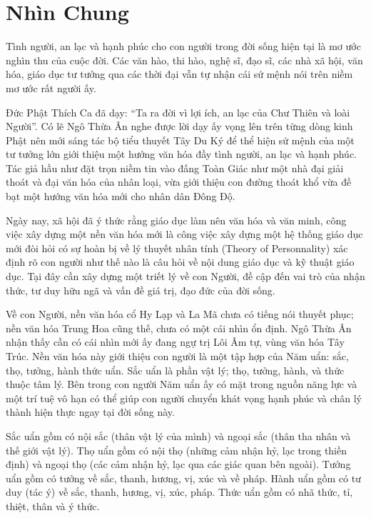 \chapter{Nhìn Chung} %
\label{cha:nhin_chung}

Tình người, an lạc và hạnh phúc cho con người trong đời sống hiện tại là mơ ước nghìn thu của cuộc đời. Các văn hào, thi hào, nghệ sĩ, đạo sĩ, các nhà xã hội, văn hóa, giáo dục tư tưởng qua các thời đại vẫn tự nhận cái sứ mệnh nói trên niềm mơ ước rất người ấy.

Đức Phật Thích Ca đã dạy: ``Ta ra đời vì lợi ích, an lạc của Chư Thiên và loài Người''. Có lẽ Ngô Thừa Ân nghe được lời dạy ấy vọng lên trên từng dòng kinh Phật nên mới sáng tác bộ tiểu thuyết Tây Du Ký để thể hiện sứ mệnh của một tư tưởng lớn giới thiệu một hướng văn hóa đầy tình người, an lạc và hạnh phúc. Tác giả hầu như đặt trọn niềm tin vào đấng Toàn Giác như một nhà đại giải thoát và đại văn hóa của nhân loại, vừa giới thiệu con đường thoát khổ vừa đề bạt một hướng văn hóa mới cho nhân dân Đông Độ.

Ngày nay, xã hội đã ý thức rằng giáo dục làm nên văn hóa và văn minh, công việc xây dựng một nền văn hóa mới là công việc xây dựng một hệ thống giáo dục mới đòi hỏi có sự hoàn bị về lý thuyết nhân tính (Theory of Personnality) xác định rõ con người như thế nào là câu hỏi về nội dung giáo dục và kỹ thuật giáo dục. Tại đây cần xây dựng một triết lý về con Người, đề cập đến vai trò của nhận thức, tư duy hữu ngã và vấn đề giá trị, đạo đức của đời sống.

Về con Người, nền văn hóa cổ Hy Lạp và La Mã chưa có tiếng nói thuyết phục; nền văn hóa Trung Hoa cũng thế, chưa có một cái nhìn ổn định. Ngô Thừa Ân nhận thấy cần có cái nhìn mới ấy đang ngự trị Lôi Âm tự, vùng văn hóa Tây Trúc. Nền văn hóa này giới thiệu con người là một tập hợp của Năm uẩn: sắc, thọ, tưởng, hành thức uẩn. Sắc uẩn là phần vật lý; thọ, tưởng, hành, và thức thuộc tâm lý. Bên trong con người Năm uẩn ấy có mặt trong nguồn năng lực và một trí tuệ vô hạn có thể giúp con người chuyển khát vọng hạnh phúc và chân lý thành hiện thực ngay tại đời sống này.

Sắc uẩn gồm có nội sắc (thân vật lý của mình) và ngoại sắc (thân tha nhân và thế giới vật lý). Thọ uẩn gồm có nội thọ (những cảm nhận hỷ, lạc trong thiền định) và ngoại thọ (các cảm nhận hỷ, lạc qua các giác quan bên ngoài). Tưởng uẩn gồm có tưởng về sắc, thanh, hương, vị, xúc và về pháp. Hành uẩn gồm có tư duy (tác ý) về sắc, thanh, hương, vị, xúc, pháp. Thức uẩn gồm có nhã thức, tỉ, thiệt, thân và ý thức.

